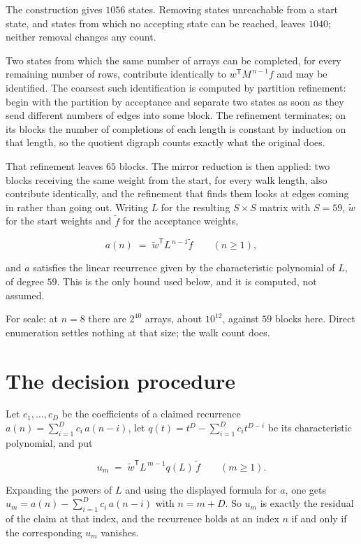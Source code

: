 \documentclass[11pt]{article}
\theoremstyle{definition}
\begin{document}
The construction gives $1056$ states. Removing states unreachable from a start state, and states from which no accepting state can be reached, leaves $1040$; neither removal changes any count.

Two states from which the same number of arrays can be completed, for every remaining number of rows, contribute identically to $w^{\mathsf T}M^{\,n-1}f$ and may be identified. The coarsest such identification is computed by partition refinement: begin with the partition by acceptance and separate two states as soon as they send different numbers of edges into some block. The refinement terminates; on its blocks the number of completions of each length is constant by induction on that length, so the quotient digraph counts exactly what the original does.

That refinement leaves $65$ blocks. The mirror reduction is then applied: two blocks receiving the same weight from the start, for every walk length, also contribute identically, and the refinement that finds them looks at edges coming in rather than going out. Writing $L$ for the resulting $S \times S$ matrix with $S = 59$, $\tilde w$ for the start weights and $\tilde f$ for the acceptance weights,

\[a(n) \;=\; \tilde w^{\mathsf T} L^{\,n-1} \tilde f \qquad (n \ge 1),\]

and $a$ satisfies the linear recurrence given by the characteristic polynomial of $L$, of degree $59$. This is the only bound used below, and it is computed, not assumed.

For scale: at $n = 8$ there are $2^{40}$ arrays, about $10^{12}$, against $59$ blocks here. Direct enumeration settles nothing at that size; the walk count does.

\section{The decision procedure}

Let $c_1,\dots,c_D$ be the coefficients of a claimed recurrence $a(n) = \sum_{i=1}^{D} c_i\,a(n-i)$, let $q(t) = t^{D} - \sum_{i=1}^{D} c_i t^{D-i}$ be its characteristic polynomial, and put

\[u_m \;=\; \tilde w^{\mathsf T} L^{\,m-1} q(L)\,\tilde f \qquad (m \ge 1).\]

Expanding the powers of $L$ and using the displayed formula for $a$, one gets $u_m = a(n) - \sum_{i=1}^{D} c_i\,a(n-i)$ with $n = m + D$. So $u_m$ is exactly the residual of the claim at that index, and the recurrence holds at an index $n$ if and only if the corresponding $u_m$ vanishes.
\end{document}
